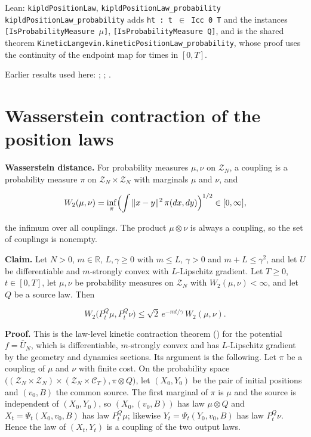 \documentclass[11pt,a4paper]{article}
\begin{document}
\begin{leanbox}{Lean: \texttt{kipldPositionLaw}, \texttt{kipldPositionLaw\_\allowbreak{}probability}}
\texttt{kipld\allowbreak{}Position\allowbreak{}Law\_\allowbreak{}probability} adds \texttt{ht : t \ensuremath{\in} Icc 0 T} and the instances \texttt{[Is\allowbreak{}Probability\allowbreak{}Measure \ensuremath{\mu}]}, \texttt{[Is\allowbreak{}Probability\allowbreak{}Measure Q]}, and is the shared theorem \texttt{Kinetic\allowbreak{}Langevin.\allowbreak{}kinetic\allowbreak{}Position\allowbreak{}Law\_\allowbreak{}probability}, whose proof uses the continuity of the endpoint map for times in \([0,T]\).
\end{leanbox}


Earlier results used here: \cite[Section~3.1.1]{LangevinLean2026IPLA}; \cite[Section~3.2.2]{LangevinLean2026Kinetic}; \cite[Section~3.9.6]{LangevinLean2026Kinetic}.

\section{\texorpdfstring{Wasserstein contraction of the position laws}{Wasserstein contraction of the position laws}}


\textbf{Wasserstein distance.} For probability measures \(\mu,\nu\) on \(\mathcal Z_N\), a coupling is a probability measure \(\pi\) on \(\mathcal Z_N\times\mathcal Z_N\) with marginals \(\mu\) and \(\nu\), and


\[W_2(\mu,\nu)=\inf_\pi\Bigl(\int\|x-y\|^2\,\pi(dx,dy)\Bigr)^{1/2}\in[0,\infty],\]


the infimum over all couplings. The product \(\mu\otimes\nu\) is always a coupling, so the set of couplings is nonempty.




\textbf{Claim.} Let \(N>0\), \(m\in\mathbb R\), \(L,\gamma\ge0\) with \(m\le L\), \(\gamma>0\) and \(m+L\le\gamma^2\), and let \(U\) be differentiable and \(m\)-strongly convex with \(L\)-Lipschitz gradient. Let \(T\ge0\), \(t\in[0,T]\), let \(\mu,\nu\) be probability measures on \(\mathcal Z_N\) with \(W_2(\mu,\nu)<\infty\), and let \(Q\) be a source law. Then


\[W_2\bigl(P^Q_t\mu,P^Q_t\nu\bigr)\le\sqrt2\,e^{-mt/\gamma}\,W_2(\mu,\nu).\]


\textbf{Proof.} This is the law-level kinetic contraction theorem (\cite[Section~3.9.6]{LangevinLean2026Kinetic}) for the potential \(f=\bar U_N\), which is differentiable, \(m\)-strongly convex and has \(L\)-Lipschitz gradient by the geometry and dynamics sections. Its argument is the following. Let \(\pi\) be a coupling of \(\mu\) and \(\nu\) with finite cost. On the probability space \(\bigl((\mathcal Z_N\times\mathcal Z_N)\times(\mathcal Z_N\times\mathcal C_T),\pi\otimes Q\bigr)\), let \((X_0,Y_0)\) be the pair of initial positions and \((v_0,B)\) the common source. The first marginal of \(\pi\) is \(\mu\) and the source is independent of \((X_0,Y_0)\), so \((X_0,(v_0,B))\) has law \(\mu\otimes Q\) and \(X_t=\Psi_t(X_0,v_0,B)\) has law \(P^Q_t\mu\); likewise \(Y_t=\Psi_t(Y_0,v_0,B)\) has law \(P^Q_t\nu\). Hence the law of \((X_t,Y_t)\) is a coupling of the two output laws.
\end{document}
